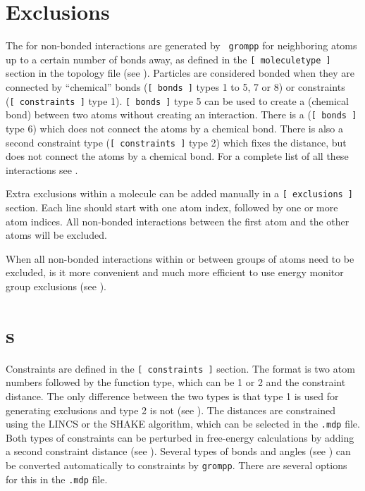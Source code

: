 \section{Exclusions}
\label{sec:excl}
The  for non-bonded interactions are generated by {\tt
grompp} for neighboring atoms up to a certain number of bonds away, as
defined in the {\tt [~moleculetype~]} section in the topology file
(see ). Particles are considered bonded when they are
connected by ``chemical'' bonds ({\tt [~bonds~]} types 1 to 5, 7 or 8)
or constraints ({\tt [~constraints~]} type 1).
{\tt[~bonds~]} type 5 can be used to create a 
(chemical bond) between two atoms without creating an interaction.
There is a 
({\tt[~bonds~]} type 6) which does not connect the atoms by a chemical bond.
There is also a second constraint type ({\tt[~constraints~]} type 2)
which fixes the distance, but does not connect
the atoms by a chemical bond.
For a complete list of all these interactions see .

Extra exclusions within a molecule can be added manually
in a {\tt [~exclusions~]} section. Each line should start with one
atom index, followed by one or more atom indices. All non-bonded
interactions between the first atom and the other atoms will be excluded.

When all non-bonded interactions within or between groups of atoms need
to be excluded, is it more convenient and much more efficient to use
energy monitor group exclusions (see ).

\section{s}
\label{sec:constraints}
Constraints are defined in the {\tt [~constraints~]} section.
The format is two atom numbers followed by the function type,
which can be 1 or 2 and the constraint distance.
The only difference between the two types is that type 1 is used
for generating exclusions and type 2 is not (see ).
The distances are constrained using the LINCS or the SHAKE algorithm,
which can be selected in the {\tt *.mdp} file.
Both types of constraints can be perturbed in free-energy calculations
by adding a second constraint distance (see ).
Several types of bonds and angles (see ) can
be converted automatically to constraints by {\tt grompp}.
There are several options for this in the {\tt *.mdp} file.

